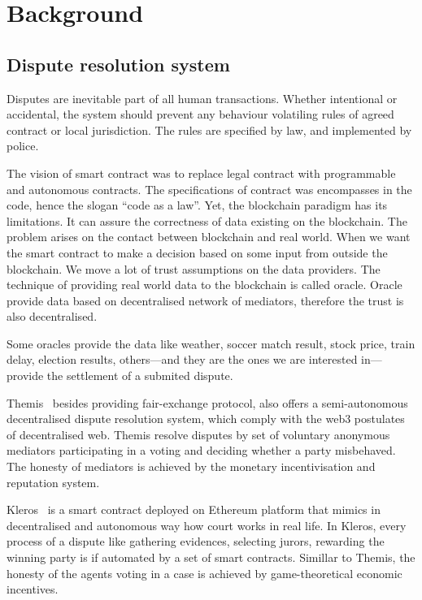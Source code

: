 \documentclass{ieeeaccess}
\begin{document}
\section{Background}\label{sec:background}
\subsection{Dispute resolution system}

Disputes are inevitable part of all human transactions. Whether intentional or accidental, the system should prevent any behaviour volatiling rules of agreed contract or local jurisdiction. The rules are specified by law, and implemented by police.

The vision of smart contract was to replace legal contract with
programmable and autonomous contracts. The specifications of contract
was encompasses in the code, hence the slogan ``code as a law''. Yet,
the blockchain paradigm has its limitations. It can assure the
correctness of data existing on the blockchain. The problem arises on
the contact between blockchain and real world. When we want the smart
contract to make a decision based on some input from outside the
blockchain. We move a lot of trust assumptions on the data providers.
The technique of providing real world data to the blockchain is called
oracle. Oracle provide data based on decentralised network of mediators,
therefore the trust is also decentralised.

Some oracles provide the data like weather, soccer match result, stock
price, train delay, election results, others---and they are the ones we
are interested in---provide the settlement of a submited dispute.


Themis~\cite{meng2019themis} besides providing fair-exchange protocol,
also offers a semi-autonomous decentralised dispute resolution system,
which comply with the web3 postulates of decentralised web. Themis
resolve disputes by set of voluntary anonymous mediators participating
in a voting and deciding whether a party misbehaved. The honesty of
mediators is achieved by the monetary incentivisation and reputation
system.

Kleros~\cite{lesaege2018kleros} is a smart contract deployed on
Ethereum platform that mimics in decentralised and autonomous way how
court works in real life. In Kleros, every process of a dispute like
gathering evidences, selecting jurors, rewarding the winning party is if
automated by a set of smart contracts. Simillar to Themis, the honesty
of the agents voting in a case is achieved by game-theoretical economic
incentives.
\end{document}
